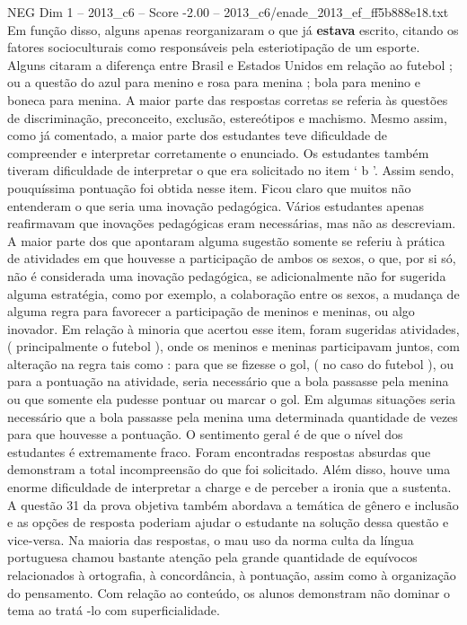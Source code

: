 \begin{textsample}{NEG Dim 1 – 2013\_c6 – Score -2.00 – 2013\_c6/enade\_2013\_ef\_ff5b888e18.txt}
Em função disso, alguns apenas reorganizaram o que já \textbf{estava} escrito, citando os fatores socioculturais como responsáveis pela esteriotipação de um esporte.
Alguns citaram a diferença entre Brasil e Estados Unidos em relação ao futebol ; ou a questão do azul para menino e rosa para menina ; bola para menino e boneca para menina.
A maior parte das respostas corretas se referia às questões de discriminação, preconceito, exclusão, estereótipos e machismo.
Mesmo assim, como já comentado, a maior parte dos estudantes teve dificuldade de compreender e interpretar corretamente o enunciado.
Os estudantes também tiveram dificuldade de interpretar o que era solicitado no item ‘ b ’.
Assim sendo, pouquíssima pontuação foi obtida nesse item.
Ficou claro que muitos não entenderam o que seria uma inovação pedagógica.
Vários estudantes apenas reafirmavam que inovações pedagógicas eram necessárias, mas não as descreviam.
A maior parte dos que apontaram alguma sugestão somente se referiu à prática de atividades em que houvesse a participação de ambos os sexos, o que, por si só, não é considerada uma inovação pedagógica, se adicionalmente não for sugerida alguma estratégia, como por exemplo, a colaboração entre os sexos, a mudança de alguma regra para favorecer a participação de meninos e meninas, ou algo inovador.
Em relação à minoria que acertou esse item, foram sugeridas atividades, ( principalmente o futebol ), onde os meninos e meninas participavam juntos, com alteração na regra tais como : para que se fizesse o gol, ( no caso do futebol ), ou para a pontuação na atividade, seria necessário que a bola passasse pela menina ou que somente ela pudesse pontuar ou marcar o gol.
Em algumas situações seria necessário que a bola passasse pela menina uma determinada quantidade de vezes para que houvesse a pontuação.
O sentimento geral é de que o nível dos estudantes é extremamente fraco.
Foram encontradas respostas absurdas que demonstram a total incompreensão do que foi solicitado.
Além disso, houve uma enorme dificuldade de interpretar a charge e de perceber a ironia que a sustenta.
A questão 31 da prova objetiva também abordava a temática de gênero e inclusão e as opções de resposta poderiam ajudar o estudante na solução dessa questão e vice-versa.
Na maioria das respostas, o mau uso da norma culta da língua portuguesa chamou bastante atenção pela grande quantidade de equívocos relacionados à ortografia, à concordância, à pontuação, assim como à organização do pensamento.
Com relação ao conteúdo, os alunos demonstram não dominar o tema ao tratá -lo com superficialidade.

\end{textsample}
